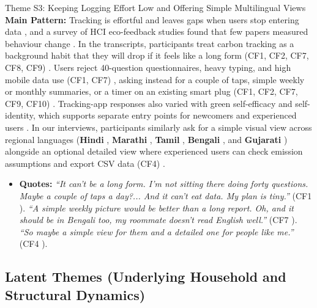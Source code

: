 \documentclass[12pt, a4paper]{article}
\begin{document}
\begin{semanticcard}{Theme S3: Keeping Logging Effort Low and Offering Simple Multilingual Views}
\textbf{Main Pattern:} Tracking is effortful and leaves gaps when users stop entering data \cite{hoffmann2024}, and a survey of HCI eco-feedback studies found that few papers measured behaviour change \cite{froehlich2010}. In the transcripts, participants treat carbon tracking as a background habit that they will drop if it feels like a long form (CF1, CF2, CF7, CF8, CF9) \cite{cf1, cf2, cf7, cf8, cf9}. Users reject 40-question questionnaires, heavy typing, and high mobile data use (CF1, CF7) \cite{cf1, cf7}, asking instead for a couple of taps, simple weekly or monthly summaries, or a timer on an existing smart plug (CF1, CF2, CF7, CF9, CF10) \cite{cf1, cf2, cf7, cf9, cf10}. Tracking-app responses also varied with green self-efficacy and self-identity, which supports separate entry points for newcomers and experienced users \cite{hoffmann2024}. In our interviews, participants similarly ask for a simple visual view across regional languages (\textbf{Hindi} \cite{cf1, cf3, cf4, cf8}, \textbf{Marathi} \cite{cf1}, \textbf{Tamil} \cite{cf4}, \textbf{Bengali} \cite{cf7}, and \textbf{Gujarati} \cite{cf10}) alongside an optional detailed view where experienced users can check emission assumptions and export CSV data (CF4) \cite{cf4}.
\begin{itemize}
    \item \textbf{Quotes:} \textit{``It can't be a long form. I'm not sitting there doing forty questions. Maybe a couple of taps a day?... And it can't eat data. My plan is tiny.''} (CF1 \cite{cf1}). \textit{``A simple weekly picture would be better than a long report. Oh, and it should be in Bengali too, my roommate doesn't read English well.''} (CF7 \cite{cf7}). \textit{``So maybe a simple view for them and a detailed one for people like me.''} (CF4 \cite{cf4}).
\end{itemize}
\end{semanticcard}

\subsection{Latent Themes (Underlying Household and Structural Dynamics)}
\end{document}
